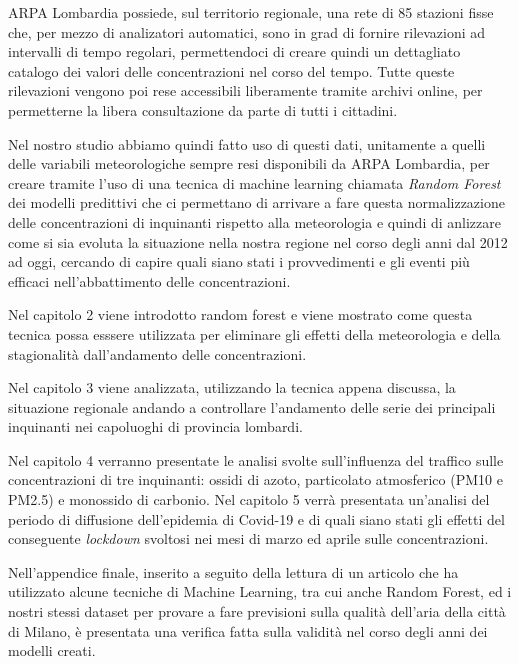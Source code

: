 \documentclass[a4paper]{report}
\begin{document}
ARPA Lombardia possiede, sul territorio regionale, una rete di 85 stazioni fisse che, per mezzo di analizatori automatici, sono in grad di fornire rilevazioni ad intervalli di tempo regolari, permettendoci di creare quindi un dettagliato catalogo dei valori delle concentrazioni nel corso del tempo. Tutte queste rilevazioni vengono poi rese accessibili liberamente tramite archivi online, per permetterne la libera consultazione da parte di tutti i cittadini.  

Nel nostro studio abbiamo quindi fatto uso di questi dati, unitamente a quelli delle variabili meteorologiche sempre resi disponibili da ARPA Lombardia, per creare tramite l'uso di una tecnica di machine learning chiamata \textit{Random Forest}
 dei modelli predittivi che ci permettano di arrivare a fare questa normalizzazione delle concentrazioni di inquinanti rispetto alla meteorologia e quindi di anlizzare come si sia evoluta la situazione nella nostra regione nel corso degli anni dal 2012 ad oggi, cercando di capire quali siano stati i provvedimenti e gli eventi più efficaci nell'abbattimento delle concentrazioni.  

Nel capitolo 2 viene introdotto random forest e viene mostrato come questa tecnica possa esssere utilizzata per eliminare gli effetti della meteorologia e della stagionalità dall'andamento delle concentrazioni.  

Nel capitolo 3 viene analizzata, utilizzando la tecnica appena discussa, la situazione regionale andando a controllare l'andamento delle serie dei principali inquinanti nei capoluoghi di provincia lombardi.  

Nel capitolo 4 verranno presentate le analisi svolte sull'influenza del traffico sulle concentrazioni di tre inquinanti: ossidi di azoto, particolato atmosferico (PM10 e PM2.5) e monossido di carbonio.
Nel capitolo 5 verrà presentata un'analisi del periodo di diffusione dell'epidemia di Covid-19 e di quali siano stati gli effetti del conseguente \textit{lockdown} svoltosi nei mesi di marzo ed aprile sulle concentrazioni.

Nell'appendice finale, inserito a seguito della lettura di un articolo \cite{app10134587} che ha utilizzato alcune tecniche di Machine Learning, tra cui anche Random Forest, ed i nostri stessi dataset per provare a fare previsioni sulla qualità dell'aria della città di Milano, è presentata una verifica fatta sulla validità nel corso degli anni dei modelli creati.
\end{document}
